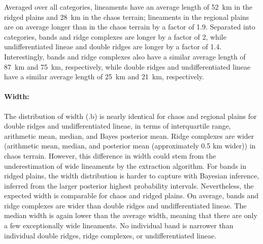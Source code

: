 Averaged over all categories, lineaments have an average length of 52~km in the ridged plains and 28~km in the chaos terrain; lineaments in the regional plains are on average longer than in the chaos terrain by a factor of 1.9. Separated into categories, bands and ridge complexes are longer by a factor of 2, while undifferentiated lineae and double ridges are longer by a factor of 1.4. Interestingly, bands and ridge complexes also have a similar average length of 87~km and 75~km, respectively, while double ridges and undifferentiated lineae have a similar average length of 25~km and 21~km, respectively.


\paragraph{Width:} The distribution of width (.b) is nearly identical for chaos and regional plains for double ridges and undifferentiated lineae, in terms of interquartile range, arithmetic mean, median, and Bayes posterior mean. Ridge complexes are wider (arithmetic mean, median, and posterior mean (approximately 0.5 km wider)) in chaos terrain. However, this difference in width could stem from the underestimation of wide lineaments by the extraction algorithm. For bands in ridged plains, the width distribution is harder to capture with Bayesian inference, inferred from the larger posterior highest probability intervals. Nevertheless, the expected width is comparable for chaos and ridged plains. 
On average, bands and ridge complexes are wider than double ridges and undifferentiated lineae. The median width is again lower than the average width, meaning that there are only a few exceptionally wide lineaments. No individual band is narrower than individual double ridges, ridge complexes, or undifferentiated lineae. 

